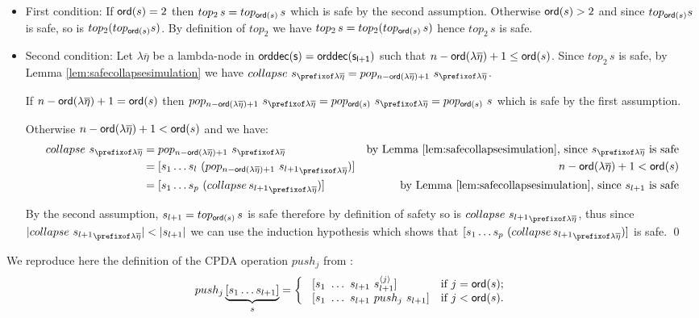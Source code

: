 \documentclass[a4paper]{article}
\theoremstyle{remark}
\theoremstyle{definition}
\newcommand\orddec{\sf orddec}
\begin{document}
\begin{itemize}
\item First condition: If ${\sf ord}(s)=2$ then $top_2\,s = top_{{\sf ord}(s)}\,s$ which is safe by the second assumption. Otherwise ${\sf ord}(s)>2$ and since $top_{{\sf ord}(s)} s$ is safe, so is $top_2(top_{{\sf ord}(s)} s)$. By definition of $top_2$ we have $top_2\,s = top_2(top_{{\sf ord}(s)}\, s)$ hence $top_2\,s$ is safe.

\item Second condition: Let $\lambda \overline{\eta}$ be a lambda-node in $\orddec(s) = \orddec(s_{l+1})$ such that $n-{\sf ord}(\lambda \overline{\eta})+1 \leq {\sf ord}(s)$.
Since $top_2\,s$ is safe, by Lemma \ref{lem:safecollapsesimulation} we have
$collapse~s_{\prefixof \lambda \overline{\eta}} = pop_{n-\ord{\lambda \overline{\eta}}+1}~s_{\prefixof \lambda \overline{\eta}}$.

If $n-{\sf ord}(\lambda \overline{\eta})+1 = {\sf ord}(s)$ then
$pop_{n-\ord{\lambda \overline{\eta}}+1}~s_{\prefixof \lambda \overline{\eta}} = pop_{\ord{s}}~s_{\prefixof\lambda\overline\eta} = pop_{\ord{s}}~s$ which is safe by the first assumption.

Otherwise $n-{\sf ord}(\lambda \overline{\eta})+1 < {\sf ord}(s)$ and we have:
\begin{align*}
  collapse~s_{\prefixof\lambda\overline\eta}
      &= pop_{n-\ord{\lambda \overline{\eta}}+1}~s_{\prefixof\lambda\overline\eta}
      & \mbox{by Lemma \ref{lem:safecollapsesimulation}, since $s_{\prefixof\lambda\overline\eta}$ is safe} \\
  &= [ s_1 \ldots s_l\ (pop_{n-\ord{\lambda\overline\eta}+1}~ {s_{l+1}}_{\prefixof\lambda\overline\eta}) ]
   & \mbox{$n-\ord{\lambda \overline{\eta}}+1<\ord{s}$}  \\
  &= [s_1 \ldots s_p\ (collapse\, {s_{l+1}}_{\prefixof\lambda\overline\eta}) ]
  & \mbox{by Lemma \ref{lem:safecollapsesimulation}, since $s_{l+1}$ is safe}
\end{align*}

By the second assumption, $s_{l+1} = top_{{\sf ord}(s)}\,s$ is safe therefore by definition
of safety so is $collapse~{s_{l+1}}_{\prefixof\lambda\overline\eta}$, thus
since $|collapse~{s_{l+1}}_{\prefixof\lambda\overline\eta}| < |s_{l+1}|$ we can use the induction hypothesis which shows that $[s_1 \ldots s_p\ (collapse\, {s_{l+1}}_{\prefixof\lambda\overline\eta}) ]$ is safe.
\qed
\end{itemize}


We reproduce here the definition of the
CPDA operation $push_j$ from \cite{hague-sto07}:
$$ push_j \underbrace{[ s_1 \ldots s_{l+1} ]}_{s} =
\left\{
  \begin{array}{ll}
\    [s_1\ \ldots\ s_{l+1}\ s_{l+1}^{\langle j \rangle}]  &\hbox{if $j = {\sf ord}(s)$;}\\
\    [s_1\ \ldots\ s_{l+1}\ push_j\ s_{l+1}]  &\hbox{if $j<{\sf ord}(s)$.}
 \end{array}
\right.
$$
\end{document}
